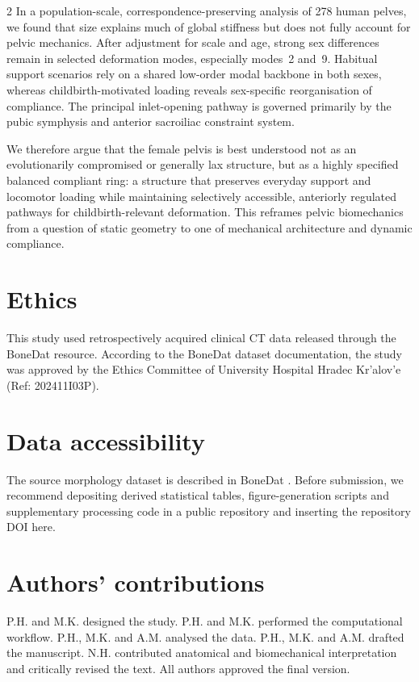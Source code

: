 \documentclass[openacc]{rsproca_new}
\begin{document}
\begin{multicols}{2}
In a population-scale, correspondence-preserving analysis of 278 human pelves, we found that size explains much of global stiffness but does not fully account for pelvic mechanics. After adjustment for scale and age, strong sex differences remain in selected deformation modes, especially modes~2 and~9. Habitual support scenarios rely on a shared low-order modal backbone in both sexes, whereas childbirth-motivated loading reveals sex-specific reorganisation of compliance. The principal inlet-opening pathway is governed primarily by the pubic symphysis and anterior sacroiliac constraint system.

We therefore argue that the female pelvis is best understood not as an evolutionarily compromised or generally lax structure, but as a highly specified balanced compliant ring: a structure that preserves everyday support and locomotor loading while maintaining selectively accessible, anteriorly regulated pathways for childbirth-relevant deformation. This reframes pelvic biomechanics from a question of static geometry to one of mechanical architecture and dynamic compliance.

\section*{Ethics}

This study used retrospectively acquired clinical CT data released through the BoneDat resource. According to the BoneDat dataset documentation, the study was approved by the Ethics Committee of University Hospital Hradec Kr'{a}lov'{e} (Ref: 202411I03P).

\section*{Data accessibility}

The source morphology dataset is described in BoneDat \cite{HenysKuchar2025}. Before submission, we recommend depositing derived statistical tables, figure-generation scripts and supplementary processing code in a public repository and inserting the repository DOI here.

\section*{Authors' contributions}

P.H. and M.K. designed the study. P.H. and M.K. performed the computational workflow. P.H., M.K. and A.M. analysed the data. P.H., M.K. and A.M. drafted the manuscript. N.H. contributed anatomical and biomechanical interpretation and critically revised the text. All authors approved the final version.


\end{multicols}
\end{document}
